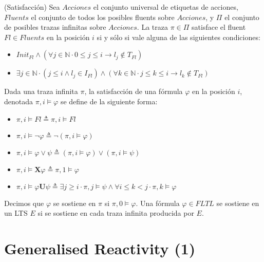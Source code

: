 \begin{definition}{(Satisfacción)}
Sea $Acciones$ el conjunto universal de etiquetas de acciones, $Fluents$ el conjunto de todos los posibles fluents sobre $Acciones$, 
y $\Pi$ el conjunto de posibles trazas infinitas sobre $Acciones$. La traza $\pi \in \Pi$ satisface el fluent $Fl \in Fluents$ en 
la posición $i$ si y sólo si vale alguna de las siguientes condiciones:

\begin{itemize}

\item
$Init_{Fl} \land (\forall j \in \mathbb{N} \cdot 0 \leq j \leq i \rightarrow l_{j} \notin T_{Fl})$

\item
$\exists j \in \mathbb{N} \cdot (j \leq i \land l_{j} \in I_{Fl}) \land (\forall k \in \mathbb{N} \cdot j \leq k \leq i \rightarrow 	l_{k} \notin T_{Fl})$

\end{itemize}

Dada una traza infinita $\pi$, la satisfacción de una fórmula $\varphi$ en la posición $i$, denotada $\pi, i\vDash \varphi$ se define de la siguiente forma:

\begin{itemize}
\item
$\pi, i\vDash Fl \triangleq \pi, i\vDash Fl$
\item
$\pi, i\vDash \neg\varphi \triangleq \neg(\pi, i\vDash \varphi)$
\item
$\pi, i\vDash \varphi \lor \psi \triangleq (\pi, i\vDash \varphi) \lor (\pi, i\vDash \psi)$
\item
$\pi, i\vDash \textbf{X}\varphi \triangleq \pi, 1\vDash \varphi$
\item
$\pi, i\vDash \varphi\textbf{U}\psi \triangleq \exists j \geq i \cdot \pi, j \vDash \psi \land \forall i \leq k < j \cdot \pi, k \vDash \varphi$
\end{itemize}

Decimos que $\varphi$ se sostiene en $\pi$ si $\pi, 0\vDash \varphi$. Una fórmula $\varphi \in FLTL$ se sostiene en un LTS $E$ si se sostiene en cada traza
infinita producida por $E$.

\end{definition}


\section{Generalised Reactivity (1)}

